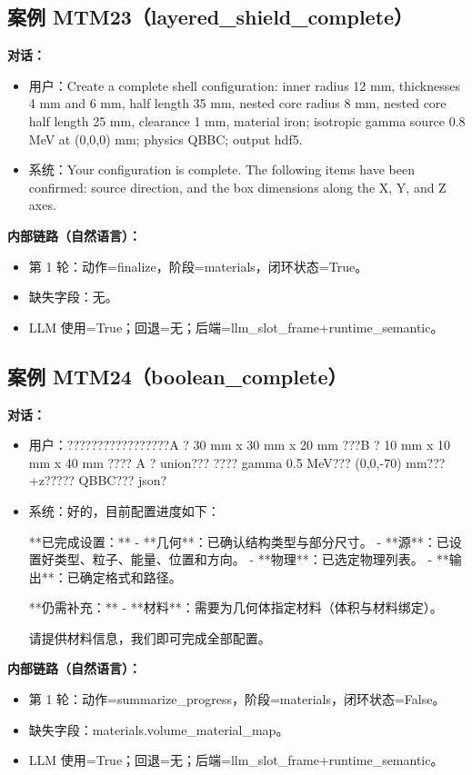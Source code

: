 \documentclass[11pt]{ctexart}
\begin{document}
\subsection{案例 MTM23（layered\_shield\_complete）}
\textbf{对话：}
\begin{itemize}
\item 用户：Create a complete shell configuration: inner radius 12 mm, thicknesses 4 mm and 6 mm, half length 35 mm, nested core radius 8 mm, nested core half length 25 mm, clearance 1 mm, material iron; isotropic gamma source 0.8 MeV at (0,0,0) mm; physics QBBC; output hdf5.
\item 系统：Your configuration is complete. The following items have been confirmed: source direction, and the box dimensions along the X, Y, and Z axes.
\end{itemize}
\textbf{内部链路（自然语言）：}
\begin{itemize}
\item 第 1 轮：动作=finalize，阶段=materials，闭环状态=True。
\item 缺失字段：无。
\item LLM 使用=True；回退=无；后端=llm\_slot\_frame+runtime\_semantic。
\end{itemize}
\subsection{案例 MTM24（boolean\_complete）}
\textbf{对话：}
\begin{itemize}
\item 用户：?????????????????A ? 30 mm x 30 mm x 20 mm ???B ? 10 mm x 10 mm x 40 mm ???? A ? union??? ???? gamma 0.5 MeV??? (0,0,-70) mm??? +z????? QBBC??? json?
\item 系统：好的，目前配置进度如下：

**已完成设置：**
- **几何**：已确认结构类型与部分尺寸。
- **源**：已设置好类型、粒子、能量、位置和方向。
- **物理**：已选定物理列表。
- **输出**：已确定格式和路径。

**仍需补充：**
- **材料**：需要为几何体指定材料（体积与材料绑定）。

请提供材料信息，我们即可完成全部配置。
\end{itemize}
\textbf{内部链路（自然语言）：}
\begin{itemize}
\item 第 1 轮：动作=summarize\_progress，阶段=materials，闭环状态=False。
\item 缺失字段：materials.volume\_material\_map。
\item LLM 使用=True；回退=无；后端=llm\_slot\_frame+runtime\_semantic。
\end{itemize}
\end{document}
